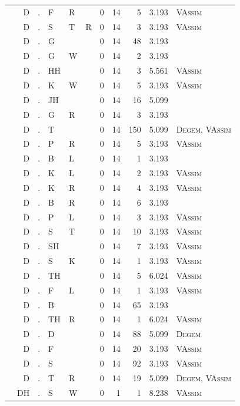 \documentclass[12pt]{article}
\begin{document}
\begin{longtable}{r@{ } r@{ } c@{ } l@{ } l@{ } l@{ } r r r r l }
 & D & . & F & R &  & 0 & 14 & 5 & 3.193 & \textsc{VAssim} \\
 & D & . & S & T & R & 0 & 14 & 3 & 3.193 & \textsc{VAssim} \\
 & D & . & G &  &  & 0 & 14 & 48 & 3.193 &  \\
 & D & . & G & W &  & 0 & 14 & 2 & 3.193 &  \\
 & D & . & HH &  &  & 0 & 14 & 3 & 5.561 & \textsc{VAssim} \\
 & D & . & K & W &  & 0 & 14 & 5 & 3.193 & \textsc{VAssim} \\
 & D & . & JH &  &  & 0 & 14 & 16 & 5.099 &  \\
 & D & . & G & R &  & 0 & 14 & 3 & 3.193 &  \\
 & D & . & T &  &  & 0 & 14 & 150 & 5.099 & \textsc{Degem}, \textsc{VAssim} \\
 & D & . & P & R &  & 0 & 14 & 5 & 3.193 & \textsc{VAssim} \\
 & D & . & B & L &  & 0 & 14 & 1 & 3.193 &  \\
 & D & . & K & L &  & 0 & 14 & 2 & 3.193 & \textsc{VAssim} \\
 & D & . & K & R &  & 0 & 14 & 4 & 3.193 & \textsc{VAssim} \\
 & D & . & B & R &  & 0 & 14 & 6 & 3.193 &  \\
 & D & . & P & L &  & 0 & 14 & 3 & 3.193 & \textsc{VAssim} \\
 & D & . & S & T &  & 0 & 14 & 10 & 3.193 & \textsc{VAssim} \\
 & D & . & SH &  &  & 0 & 14 & 7 & 3.193 & \textsc{VAssim} \\
 & D & . & S & K &  & 0 & 14 & 1 & 3.193 & \textsc{VAssim} \\
 & D & . & TH &  &  & 0 & 14 & 5 & 6.024 & \textsc{VAssim} \\
 & D & . & F & L &  & 0 & 14 & 1 & 3.193 & \textsc{VAssim} \\
 & D & . & B &  &  & 0 & 14 & 65 & 3.193 &  \\
 & D & . & TH & R &  & 0 & 14 & 1 & 6.024 & \textsc{VAssim} \\
 & D & . & D &  &  & 0 & 14 & 88 & 5.099 & \textsc{Degem} \\
 & D & . & F &  &  & 0 & 14 & 20 & 3.193 & \textsc{VAssim} \\
 & D & . & S &  &  & 0 & 14 & 92 & 3.193 & \textsc{VAssim} \\
 & D & . & T & R &  & 0 & 14 & 19 & 5.099 & \textsc{Degem}, \textsc{VAssim} \\
 & DH & . & S & W &  & 0 & 1 & 1 & 8.238 & \textsc{VAssim} \\

\end{longtable}
\end{document}
